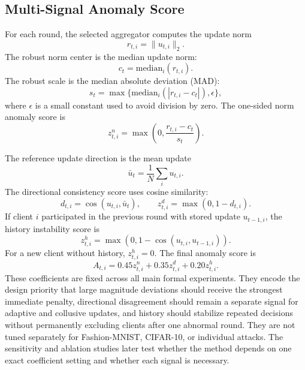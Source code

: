 \documentclass[preprint,12pt]{elsarticle}
\begin{document}
\subsection{Multi-Signal Anomaly Score}

For each round, the selected aggregator computes the update norm
\begin{equation}
r_{t,i}=\lVert u_{t,i}\rVert_2.
\end{equation}
The robust norm center is the median update norm:
\begin{equation}
c_t=\mathrm{median}_i(r_{t,i}).
\end{equation}
The robust scale is the median absolute deviation (MAD):
\begin{equation}
s_t=\max\{\mathrm{median}_i(|r_{t,i}-c_t|),\epsilon\},
\end{equation}
where $\epsilon$ is a small constant used to avoid division by zero. The one-sided norm anomaly score is
\begin{equation}
z^n_{t,i}=\max\left(0,\frac{r_{t,i}-c_t}{s_t}\right).
\end{equation}

The reference update direction is the mean update
\begin{equation}
\bar{u}_t=\frac{1}{N}\sum_i u_{t,i}.
\end{equation}
The directional consistency score uses cosine similarity:
\begin{equation}
d_{t,i}=\cos(u_{t,i},\bar{u}_t), \qquad
z^d_{t,i}=\max(0,1-d_{t,i}).
\end{equation}
If client $i$ participated in the previous round with stored update $u_{t-1,i}$, the history instability score is
\begin{equation}
z^h_{t,i}=\max(0,1-\cos(u_{t,i},u_{t-1,i})).
\end{equation}
For a new client without history, $z^h_{t,i}=0$. The final anomaly score is
\begin{equation}
A_{t,i}=0.45z^n_{t,i}+0.35z^d_{t,i}+0.20z^h_{t,i}.
\end{equation}
These coefficients are fixed across all main formal experiments. They encode the design priority that large magnitude deviations should receive the strongest immediate penalty, directional disagreement should remain a separate signal for adaptive and collusive updates, and history should stabilize repeated decisions without permanently excluding clients after one abnormal round. They are not tuned separately for Fashion-MNIST, CIFAR-10, or individual attacks. The sensitivity and ablation studies later test whether the method depends on one exact coefficient setting and whether each signal is necessary.
\end{document}
